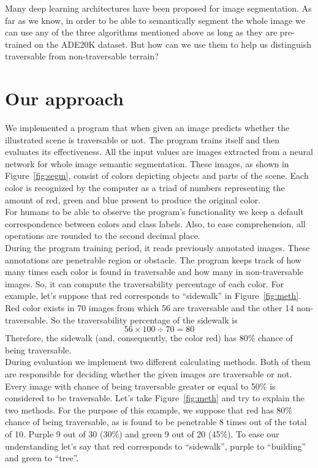\documentclass[12pt,a4paper,table,dvipsnames,tikz]{report}
\newcommand{\alleg}{\enquote}
\newcommand{\acronym}{\MakeUppercase}
\newcommand{\bl}[1]{{\hypersetup{linkcolor=blue}#1}}
\begin{document}
	
	Many deep learning architectures have been proposed for image segmentation. As far as
	we know, in order to be able to semantically segment the whole image we can use any 
	of the three algorithms mentioned above as long as they are pre-trained on the 
	\acronym{ade20k} dataset. But how can we use them to help us distinguish traversable 
	from non-traversable terrain?
	\\
		
	\section{Our approach}
	\label{sec:fg:app}
	
	We implemented a program that when given an image predicts whether the illustrated 
	scene is traversable or not. The program trains itself and then evaluates its 
	effectiveness. All the input values are images extracted from a neural network for whole 
	image semantic segmentation. These images, as shown in Figure~\bl{\ref{fig:segm}}, consist 
	of colors depicting objects and parts of the scene. Each color is recognized by the 
	computer as a triad of numbers representing the amount of red, green and blue present 
	to produce the original color. 
	\\
	
	For humans to be able to observe the program's functionality we keep a default 
	correspondence between colors and class labels. Also, to ease comprehension, all 
	operations are rounded to the second decimal place.
	\\
	
	During the program training period, it reads previously annotated images. These 
	annotations are penetrable region or obstacle. The program keeps track of how many times 
	each color is found in traversable and how many in non-traversable images. So, it can 
	compute the traversability percentage of each color. For example, let's suppose that 
	red corresponds to \alleg{sidewalk} in Figure~\bl{\ref{fig:meth}}. Red color 
	exists in 70 images from which 56 are traversable and the other 14 non-traversable. 
	So the traversability percentage of the sidewalk is 
	\[ 56 \times 100 \div 70 = 80 \]
	Therefore, the sidewalk (and, consequently, the color red) has 80\% chance of 
	being traversable.
	\\
	
	During evaluation we implement two different calculating methods. Both of them are 
	responsible for deciding whether the given images are traversable or not. Every image 
	with chance of being traversable greater or equal to 50\% is considered to be traversable. 
	Let's take Figure~\bl{\ref{fig:meth}} and try to explain the two methods. For the purpose
	of this example, we suppose that red has 80\% chance of being traversable, as is found to be 
	penetrable 8 times out of the total of 10. Purple 9 out of 30 (30\%) and green 9 out 
	of 20 (45\%). To ease our understanding let's say that red corresponds to \alleg{sidewalk}, 
	purple to \alleg{building} and green to \alleg{tree}.
	
\end{document}
